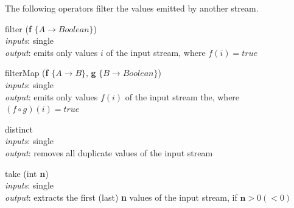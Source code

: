 \documentclass{dithesis}
\begin{document}
The following operators filter the values emitted by another stream.
\begin{description}

\begin{minipage}[c]{0.4\linewidth}
\item[filter] (\textbf{f} $\{ A \to Boolean \}$) \\
	\textit{inputs}: single \\
	\textit{output}: emits only values $i$ of the input stream, where $f(i) = true$
\end{minipage}
\begin{minipage}[c]{0.6\linewidth}

\end{minipage}

\begin{minipage}[c]{0.4\linewidth}
\item[filterMap] (\textbf{f} $\{ A \to B \}$, \textbf{g} $\{ B \to Boolean \}$) \\
	\textit{inputs}: single \\
	\textit{output}: emits only values $f(i)$ of the input stream the, where $(f \circ g)(i) = true$
\end{minipage}
\begin{minipage}[c]{0.6\linewidth}

\end{minipage}

\begin{minipage}[c]{0.4\linewidth}
\item[distinct] ~\\
	\textit{inputs}: single \\
	\textit{output}: removes all duplicate values of the input stream		
\end{minipage}
\begin{minipage}[c]{0.6\linewidth}

\end{minipage}

\begin{minipage}[c]{0.4\linewidth}
\item[take] (int \textbf{n}) \\
	\textit{inputs}: single \\
	\textit{output}: extracts the first (last) \textbf{n} values of the input stream, if $\textbf{n} > 0 (< 0)$			
\end{minipage}
\begin{minipage}[c]{0.6\linewidth}

\end{minipage}


\end{description}
\end{document}
